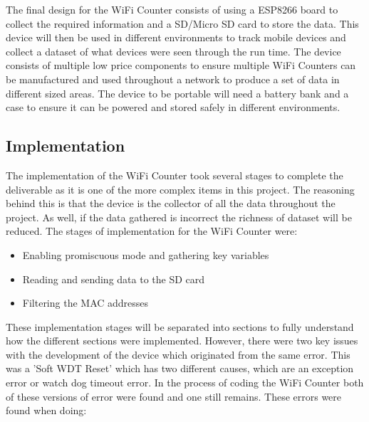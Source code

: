 \documentclass{report}
\begin{document}
The final design for the WiFi Counter consists of using a ESP8266 board to collect the required information and a SD/Micro SD card to store the data. This device will then be used in different environments to track mobile devices and collect a dataset of what devices were seen through the run time. The device consists of multiple low price components to ensure multiple WiFi Counters can be manufactured and used throughout a network to produce a set of data in different sized areas. The device to be portable will need a battery bank and a case to ensure it can be powered and stored safely in different environments.  \\ \newline

\subsection{Implementation}
The implementation of the WiFi Counter took several stages to complete the deliverable as it is one of the more complex items in this project. The reasoning behind this is that the device is the collector of all the data throughout the project. As well, if the data gathered is incorrect the richness of dataset will be reduced. The stages of implementation for the WiFi Counter were:
\begin{itemize}
    \item Enabling promiscuous mode and gathering key variables
    \item Reading and sending data to the SD card
    \item Filtering the MAC addresses
\end{itemize}
These implementation stages will be separated into sections to fully understand how the different sections were implemented. However, there were two key issues with the development of the device which originated from the same error. This was a 'Soft WDT Reset'\cite{SoftWDTReset} which has two different causes, which are an exception error or watch dog timeout error. In the process of coding the WiFi Counter both of these versions of error were found and one still remains. These errors were found when doing:
\end{document}
